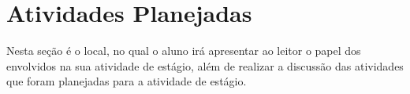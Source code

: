

\section{Atividades Planejadas}
    \label{sec:atividades-planejadas}
    
    Nesta seção é o local, no qual o aluno irá apresentar ao leitor o papel dos envolvidos na sua atividade de estágio, além de realizar a discussão das atividades que foram planejadas para a atividade de estágio.